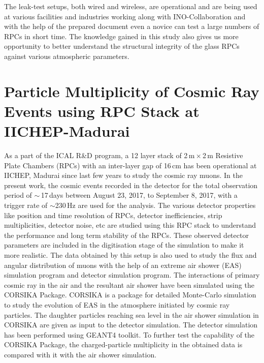 \documentclass[a4paper,12pt,twoside]{article}
\begin{document}
The leak-test setups, both wired and wireless, are operational and are being used at various facilities and industries working along with INO-Collaboration and with the help of the prepared document even a novice can test a large numbers of RPCs in short time. The knowledge gained in this study also gives us more opportunity to better understand the structural integrity of the glass RPCs against various atmospheric parameters.

\section{Particle Multiplicity of Cosmic Ray Events using RPC Stack at IICHEP-Madurai}

As a part of the ICAL R\&D program, a 12 layer stack of 2\,m\,$\times$\,2\,m Resistive Plate Chambers (RPCs) with an inter-layer gap of 16\,cm has been operational at IICHEP, Madurai since last few years to study the cosmic ray muons. In the present work, the cosmic events recorded in the detector for the total observation period of $\sim$\,17\,days between August 23, 2017, to September 8, 2017, with a trigger rate of $\sim$230\,Hz are used for the analysis. The various detector properties like position and time resolution of RPCs, detector inefficiencies, strip multiplicities, detector noise, etc are studied using this RPC stack to understand the performance and long term stability of the RPCs. These observed detector parameters are included in the digitisation stage of the simulation to make it more realistic.\cite{pethu1} The data obtained by this setup is also used to study the flux and angular distribution of muons with the help of an extreme air shower (EAS) simulation program and detector simulation program. The interactions of primary cosmic ray in the air and the resultant air shower have been simulated using the CORSIKA Package\cite{corsika763}. CORSIKA is a package for detailed Monte-Carlo simulation to study the evolution of EAS in the atmosphere initiated by cosmic ray particles. The daughter particles reaching sea level in the air shower simulation in CORSIKA are given as input to the detector simulation. The detector simulation has been performed using GEANT4 toolkit\cite{geant4}. To further test the capability of the CORSIKA Package, the charged-particle multiplicity in the obtained data is compared with it with the air shower simulation.
\end{document}
